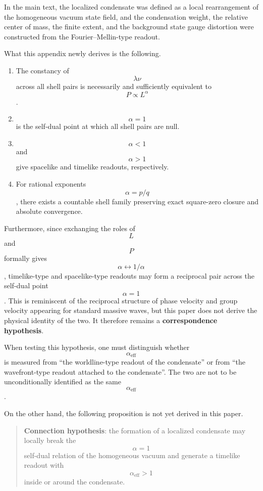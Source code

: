 \documentclass[
  a4paper,
]{article}
\providecommand{\tightlist}{%
  \setlength{\itemsep}{0pt}\setlength{\parskip}{0pt}}
\begin{document}
In the main text, the localized condensate was defined as a local
rearrangement of the homogeneous vacuum state field, and the
condensation weight, the relative center of mass, the finite extent, and
the background state gauge distortion were constructed from the
Fourier--Mellin-type readout.

What this appendix newly derives is the following.

\begin{enumerate}
\def\labelenumi{\arabic{enumi}.}
\tightlist
\item
  The constancy of \[\lambda\nu\] across all shell pairs is necessarily
  and sufficiently equivalent to \[P\propto L^\alpha\].
\item
  \[\alpha=1\] is the self-dual point at which all shell pairs are null.
\item
  \[\alpha<1\] and \[\alpha>1\] give spacelike and timelike readouts,
  respectively.
\item
  For rational exponents \[\alpha=p/q\], there exists a countable shell
  family preserving exact square-zero closure and absolute convergence.
\end{enumerate}

Furthermore, since exchanging the roles of \[L\] and \[P\] formally
gives \[\alpha\leftrightarrow1/\alpha\], timelike-type and
spacelike-type readouts may form a reciprocal pair across the self-dual
point \[\alpha=1\]. This is reminiscent of the reciprocal structure of
phase velocity and group velocity appearing for standard massive waves,
but this paper does not derive the physical identity of the two. It
therefore remains a \textbf{correspondence hypothesis}.

When testing this hypothesis, one must distinguish whether
\[\alpha_{\mathrm{eff}}\] is measured from ``the worldline-type readout
of the condensate'' or from ``the wavefront-type readout attached to the
condensate''. The two are not to be unconditionally identified as the
same \[\alpha_{\mathrm{eff}}\].

On the other hand, the following proposition is not yet derived in this
paper.

\begin{quote}
\textbf{Connection hypothesis}: the formation of a localized condensate
may locally break the \[\alpha=1\] self-dual relation of the homogeneous
vacuum and generate a timelike readout with \[\alpha_{\mathrm{eff}}>1\]
inside or around the condensate.
\end{quote}
\end{document}
